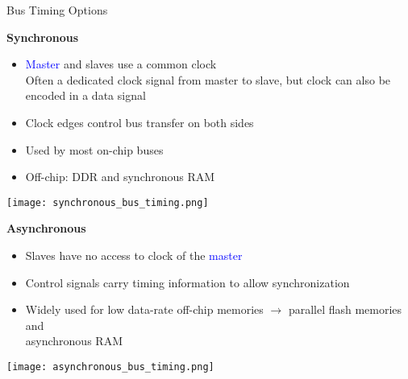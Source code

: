\begin{theorem}{Bus Timing Options}

    \begin{minipage}{0.7\linewidth}
    \textbf{Synchronous}
    \begin{itemize}
        \item \textcolor{blue}{Master} and \textcolor{darkcorn}{slaves} use a common clock\\
        \small{Often a dedicated clock signal from master to slave, but clock can also be encoded in a data signal}
        \item \normalsize Clock edges control bus transfer on both sides
        \item Used by most on-chip buses
        \item Off-chip: DDR and synchronous RAM
    \end{itemize}
    \end{minipage}
    \begin{minipage}{0.29\linewidth}
        \texttt{[image: synchronous\_bus\_timing.png]}
    \end{minipage}

    \begin{minipage}{0.7\linewidth}
    \textbf{Asynchronous}
    \begin{itemize}
        \item \textcolor{darkcorn}{Slaves} have no access to clock of the \textcolor{blue}{master}
        \item Control signals carry timing information to allow synchronization
        \item Widely used for low data-rate off-chip memories
        $\rightarrow$ parallel flash memories and \\ asynchronous RAM
    \end{itemize}
    \end{minipage}
    \begin{minipage}{0.29\linewidth}
        \texttt{[image: asynchronous\_bus\_timing.png]}
    \end{minipage}
\end{theorem}

